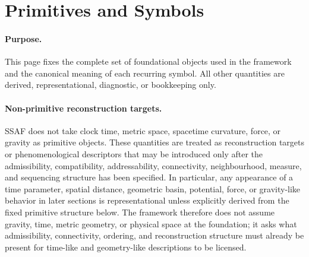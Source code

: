 \documentclass[aps,prx,onecolumn,11pt]{revtex4-2}
\theoremstyle{plain}
\theoremstyle{definition}
\theoremstyle{remark}
\begin{document}
\section*{Primitives and Symbols}

\paragraph{Purpose.}
This page fixes the complete set of foundational objects used in the
framework and the canonical meaning of each recurring symbol. All other
quantities are derived, representational, diagnostic, or bookkeeping
only.

\paragraph{Non-primitive reconstruction targets.}
SSAF does not take clock time, metric space, spacetime curvature,
force, or gravity as primitive objects. These quantities are treated as
reconstruction targets or phenomenological descriptors that may be
introduced only after the admissibility, compatibility, addressability,
connectivity, neighbourhood, measure, and sequencing structure has been
specified. In particular, any appearance of a time parameter, spatial
distance, geometric basin, potential, force, or gravity-like behavior in
later sections is representational unless explicitly derived from the
fixed primitive structure below. The framework therefore does not assume
gravity, time, metric geometry, or physical space at the foundation; it
asks what admissibility, connectivity, ordering, and reconstruction
structure must already be present for time-like and geometry-like
descriptions to be licensed.
\end{document}
